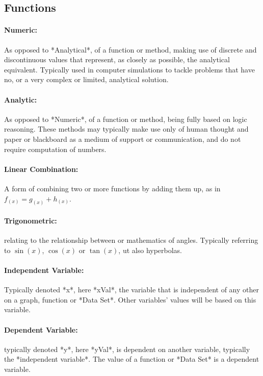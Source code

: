 \documentclass[main.tex]{subfiles}
\begin{document}
    \subsection{Functions}
   
      \paragraph{Numeric:} As opposed to *Analytical*, of a function or method, making use of discrete and discontinuous values that represent, as closely as possible, the analytical equivalent. Typically used in computer simulations to tackle problems that have no, or a very complex or limited, analytical solution.
      
      \paragraph{Analytic:} As opposed to *Numeric*, of a function or method, being fully based on logic reasoning. These methods may typically make use only of human thought and paper or blackboard as a medium of support or communication, and do not require computation of numbers.
        
      \paragraph{Linear Combination:} A form of combining two or more functions by  adding them up, as in $f_{(x)}= g_{(x)} + h_{(x)}$.
       
      \paragraph{Trigonometric:} relating to the relationship between or mathematics of angles. Typically referring to $\sin(x)$, $\cos(x)$ or $\tan(x)$, ut also hyperbolas.
      
      \paragraph{Independent Variable:} Typically denoted *x*, here *xVal*, the variable that is independent of any other on a graph, function or *Data Set*. Other variables' values will be based on this variable.
      
      \paragraph{Dependent Variable:} typically denoted *y*, here *yVal*, is dependent on another variable, typically the *independent variable*. The value of a function or *Data Set* is a dependent variable.
  
  
\end{document}
